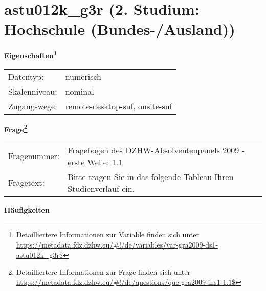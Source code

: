 
    \setcounter{footnote}{0}

    \vspace*{-1.8cm}
	\section{astu012k\_g3r (2. Studium: Hochschule (Bundes-/Ausland))}
	\label{section:astu012k_g3r}



    \vspace*{0.5cm}
    \noindent\textbf{Eigenschaften\footnote{Detailliertere Informationen zur Variable finden sich unter
		\url{https://metadata.fdz.dzhw.eu/\#!/de/variables/var-gra2009-ds1-astu012k_g3r$}}}\\
	\begin{tabularx}{\hsize}{@{}lX}
	Datentyp: & numerisch \\
	Skalenniveau: & nominal \\
	Zugangswege: &
	  remote-desktop-suf, 
	  onsite-suf
 \\
    \end{tabularx}



				\vspace*{0.5cm}
                \noindent\textbf{Frage\footnote{Detailliertere Informationen zur Frage finden sich unter
		              \url{https://metadata.fdz.dzhw.eu/\#!/de/questions/que-gra2009-ins1-1.1$}}}\\
				\begin{tabularx}{\hsize}{@{}lX}
					Fragenummer: &
					  Fragebogen des DZHW-Absolventenpanels 2009 - erste Welle:
					  1.1
 \\
					Fragetext: & Bitte tragen Sie in das folgende Tableau Ihren Studienverlauf ein. \\
				\end{tabularx}





        		\vspace*{0.5cm}
                \noindent\textbf{Häufigkeiten}

